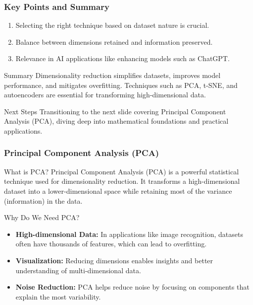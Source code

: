 \documentclass[aspectratio=169]{beamer}
\begin{document}
\begin{frame}[fragile]
    \frametitle{Key Points and Summary}

    \begin{enumerate}
        \item Selecting the right technique based on dataset nature is crucial.
        \item Balance between dimensions retained and information preserved.
        \item Relevance in AI applications like enhancing models such as ChatGPT.
    \end{enumerate}

    \begin{block}{Summary}
        Dimensionality reduction simplifies datasets, improves model performance, and mitigates overfitting. Techniques such as PCA, t-SNE, and autoencoders are essential for transforming high-dimensional data.
    \end{block}

    \begin{block}{Next Steps}
        Transitioning to the next slide covering Principal Component Analysis (PCA), diving deep into mathematical foundations and practical applications.
    \end{block}
\end{frame}

\begin{frame}[fragile]
    \frametitle{Principal Component Analysis (PCA)}
    \begin{block}{What is PCA?}
        Principal Component Analysis (PCA) is a powerful statistical technique used for dimensionality reduction. It transforms a high-dimensional dataset into a lower-dimensional space while retaining most of the variance (information) in the data.
    \end{block}
    
    \begin{block}{Why Do We Need PCA?}
        \begin{itemize}
            \item \textbf{High-dimensional Data:} In applications like image recognition, datasets often have thousands of features, which can lead to overfitting.
            \item \textbf{Visualization:} Reducing dimensions enables insights and better understanding of multi-dimensional data.
            \item \textbf{Noise Reduction:} PCA helps reduce noise by focusing on components that explain the most variability.
        \end{itemize}
    \end{block}
\end{frame}
\end{document}

